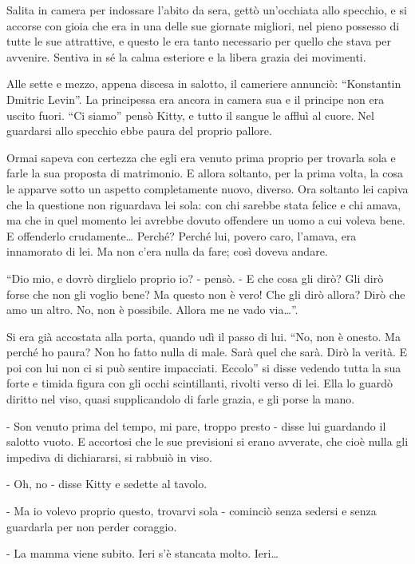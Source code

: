 Salita in camera per indossare l'abito da sera, gettò un'occhiata allo specchio, e si accorse con gioia che era in una delle sue giornate migliori, nel pieno possesso di tutte le sue attrattive, e questo le era tanto necessario per quello che stava per avvenire. Sentiva in sé la calma esteriore e la libera grazia dei movimenti. 

Alle sette e mezzo, appena discesa in salotto, il cameriere annunciò: ``Konstantin Dmitric Levin''. La principessa era ancora in camera sua e il principe non era uscito fuori. ``Ci siamo'' pensò Kitty, e tutto il sangue le affluì al cuore. Nel guardarsi allo specchio ebbe paura del proprio pallore. 

Ormai sapeva con certezza che egli era venuto prima proprio per trovarla sola e farle la sua proposta di matrimonio. E allora soltanto, per la prima volta, la cosa le apparve sotto un aspetto completamente nuovo, diverso. Ora soltanto lei capiva che la questione non riguardava lei sola: con chi sarebbe stata felice e chi amava, ma che in quel momento lei avrebbe dovuto offendere un uomo a cui voleva bene. E offenderlo crudamente\ldots{} Perché? Perché lui, povero caro, l'amava, era innamorato di lei. Ma non c'era nulla da fare; così doveva andare. 

``Dio mio, e dovrò dirglielo proprio io? - pensò. - E che cosa gli dirò? Gli dirò forse che non gli voglio bene? Ma questo non è vero! Che gli dirò allora? Dirò che amo un altro. No, non è possibile. Allora me ne vado via\ldots{}''. 

Si era già accostata alla porta, quando udì il passo di lui. ``No, non è onesto. Ma perché ho paura? Non ho fatto nulla di male. Sarà quel che sarà. Dirò la verità. E poi con lui non ci si può sentire impacciati. Eccolo'' si disse vedendo tutta la sua forte e timida figura con gli occhi scintillanti, rivolti verso di lei. Ella lo guardò diritto nel viso, quasi supplicandolo di farle grazia, e gli porse la mano. 

- Son venuto prima del tempo, mi pare, troppo presto - disse lui guardando il salotto vuoto. E accortosi che le sue previsioni si erano avverate, che cioè nulla gli impediva di dichiararsi, si rabbuiò in viso. 

- Oh, no - disse Kitty e sedette al tavolo. 

- Ma io volevo proprio questo, trovarvi sola - cominciò senza sedersi e senza guardarla per non perder coraggio. 

- La mamma viene subito. Ieri s'è stancata molto. Ieri\ldots{} 

